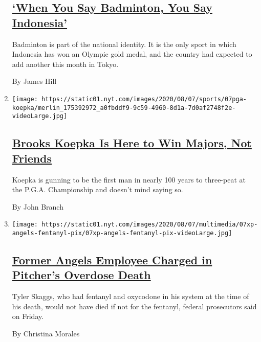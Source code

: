 \begin{enumerate}
  \hypertarget{when-you-say-badminton-you-say-indonesia}{%
  \subsection{\texorpdfstring{\href{/2020/08/07/sports/badminton-indonesia.html}{`When
  You Say Badminton, You Say
  Indonesia'}}{`When You Say Badminton, You Say Indonesia'}}\label{when-you-say-badminton-you-say-indonesia}}

  Badminton is part of the national identity. It is the only sport in
  which Indonesia has won an Olympic gold medal, and the country had
  expected to add another this month in Tokyo.

  By James Hill
\item
  \texttt{[image: https://static01.nyt.com/images/2020/08/07/sports/07pga-koepka/merlin\_175392972\_a0fbddf9-9c59-4960-8d1a-7d0af2748f2e-videoLarge.jpg]}

  \hypertarget{brooks-koepka-is-here-to-win-majors-not-friends}{%
  \subsection{\texorpdfstring{\href{/2020/08/07/sports/brooks-koepka-pga-championship.html}{Brooks
  Koepka Is Here to Win Majors, Not
  Friends}}{Brooks Koepka Is Here to Win Majors, Not Friends}}\label{brooks-koepka-is-here-to-win-majors-not-friends}}

  Koepka is gunning to be the first man in nearly 100 years to
  three-peat at the P.G.A. Championship and doesn't mind saying so.

  By John Branch
\item
  \texttt{[image: https://static01.nyt.com/images/2020/08/07/multimedia/07xp-angels-fentanyl-pix/07xp-angels-fentanyl-pix-videoLarge.jpg]}

  \hypertarget{former-angels-employee-charged-in-pitchers-overdose-death}{%
  \subsection{\texorpdfstring{\href{/2020/08/07/sports/baseball/la-angels-fentanyl-tyler-skaggs.html}{Former
  Angels Employee Charged in Pitcher's Overdose
  Death}}{Former Angels Employee Charged in Pitcher's Overdose Death}}\label{former-angels-employee-charged-in-pitchers-overdose-death}}

  Tyler Skaggs, who had fentanyl and oxycodone in his system at the time
  of his death, would not have died if not for the fentanyl, federal
  prosecutors said on Friday.

  By Christina Morales
\end{enumerate}

